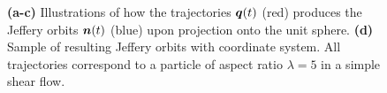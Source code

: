 \documentclass[thesis.tex]{subfiles}
\begin{document}
\begin{figure}
\begin{center}
{        }
	\end{center}
    \caption{{\bfseries(a-c)} Illustrations of how the trajectories $\mbox{\boldmath$q$}(t)$ (red) produces the Jeffery orbits $\mbox{\boldmath$n$}(t)$ (blue) upon projection onto the unit sphere. {\bfseries (d)} Sample of resulting Jeffery orbits with coordinate system. All trajectories correspond to a particle of aspect ratio $\lambda=5$ in a simple shear flow.}\label{fig:projection_orbits}
\end{figure}
\end{document}
